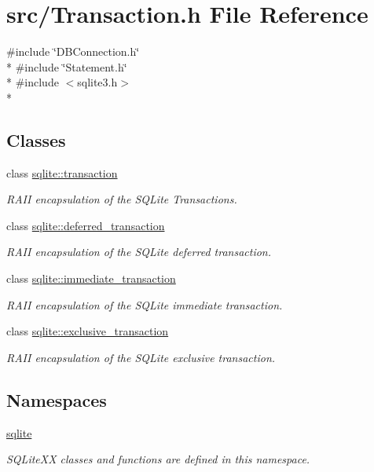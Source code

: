 \hypertarget{a00034}{\section{src/\-Transaction.h File Reference}
\label{a00034}
}
{\ttfamily \#include \char`\"{}D\-B\-Connection.\-h\char`\"{}}\\*
{\ttfamily \#include \char`\"{}Statement.\-h\char`\"{}}\\*
{\ttfamily \#include $<$sqlite3.\-h$>$}\\*
\subsection*{Classes}
\begin{DoxyCompactItemize}
\item 
class \hyperlink{a00014}{sqlite\-::transaction}
\begin{DoxyCompactList}\small\item\em R\-A\-I\-I encapsulation of the S\-Q\-Lite Transactions. \end{DoxyCompactList}\item 
class \hyperlink{a00005}{sqlite\-::deferred\-\_\-transaction}
\begin{DoxyCompactList}\small\item\em R\-A\-I\-I encapsulation of the S\-Q\-Lite deferred transaction. \end{DoxyCompactList}\item 
class \hyperlink{a00008}{sqlite\-::immediate\-\_\-transaction}
\begin{DoxyCompactList}\small\item\em R\-A\-I\-I encapsulation of the S\-Q\-Lite immediate transaction. \end{DoxyCompactList}\item 
class \hyperlink{a00007}{sqlite\-::exclusive\-\_\-transaction}
\begin{DoxyCompactList}\small\item\em R\-A\-I\-I encapsulation of the S\-Q\-Lite exclusive transaction. \end{DoxyCompactList}\end{DoxyCompactItemize}
\subsection*{Namespaces}
\begin{DoxyCompactItemize}
\item 
\hyperlink{a00038}{sqlite}
\begin{DoxyCompactList}\small\item\em S\-Q\-Lite\-X\-X classes and functions are defined in this namespace. \end{DoxyCompactList}\end{DoxyCompactItemize}
